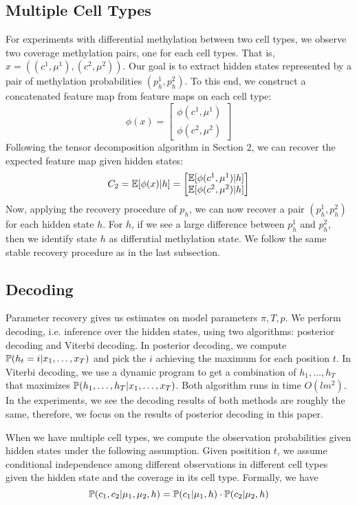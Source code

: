 \subsection{Multiple Cell Types}
For experiments with differential methylation between two cell types, we observe two
coverage methylation pairs, one for each cell types. That is, $x = ((c^1, \mu^1), (c^2, \mu^2))$.
Our goal is to extract hidden states represented by a pair of methylation probabilities $(p^1_h, p^2_h)$.
To this end, we construct a concatenated feature map from feature maps on each cell type:
\[ \phi(x) = \begin{bmatrix} \phi(c^1, \mu^1) \\ \phi(c^2, \mu^2) \end{bmatrix} \]
Following the tensor decomposition algorithm in Section 2, we can recover the expected feature map
given hidden states:
\[ C_2 = \E[\phi(x)|h] = \begin{bmatrix} \E[\phi(c^1, \mu^1)|h] \\ \E[\phi(c^2, \mu^2)|h] \end{bmatrix}\]
Now, applying the recovery procedure of $p_h$, we can now recover
a pair $(p^1_h, p^2_h)$ for each hidden state $h$. For $h$, if we see a large difference between
$p^1_h$ and $p^2_h$, then we identify state $h$ as differntial methylation state.
We follow the same stable recovery procedure as in the last subsection.

\subsection{Decoding}
Parameter recovery gives us estimates on model parameters $\pi, T, p$. We perform decoding, i.e. inference
over the hidden states, using two algorithms: posterior decoding and Viterbi decoding. In posterior decoding,
we compute $\P(h_t=i|x_1, \ldots, x_T)$ and pick the $i$ achieving the maximum for each position $t$. In Viterbi decoding,
we use a dynamic program to get a combination of $h_1, \ldots, h_T$ that maximizes
$\P(h_1, \ldots, h_T|x_1,\ldots,x_T)$. Both algorithm runs in time $O(l m^2)$. In the experiments, we see the decoding results of both methods are roughly the same, therefore, we focus on the results of posterior decoding in this paper.

When we have multiple cell types, we compute the observation probabilities given hidden states under the following assumption. Given positition $t$,
we assume conditional independence among different observations in different cell types given the hidden state and the coverage in its cell type. Formally, we have
\[ \P(c_1, c_2 | \mu_1, \mu_2, h) = \P(c_1 | \mu_1, h) \cdot \P(c_2 | \mu_2, h) \]
